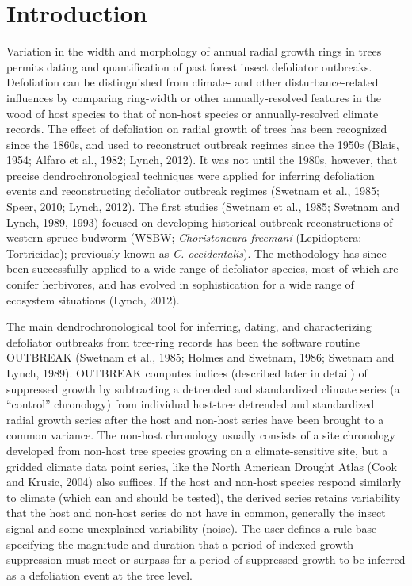 \documentclass[review]{elsarticle} %
\begin{document}
\hypertarget{introduction}{%
\section{Introduction}\label{introduction}}

Variation in the width and morphology of annual radial growth rings in trees permits dating and quantification of past forest insect defoliator outbreaks. Defoliation can be distinguished from climate- and other disturbance-related influences by comparing ring-width or other annually-resolved features in the wood of host species to that of non-host species or annually-resolved climate records. The effect of defoliation on radial growth of trees has been recognized since the 1860s, and used to reconstruct outbreak regimes since the 1950s (Blais, 1954; Alfaro et al., 1982; Lynch, 2012). It was not until the 1980s, however, that precise dendrochronological techniques were applied for inferring defoliation events and reconstructing defoliator outbreak regimes (Swetnam et al., 1985; Speer, 2010; Lynch, 2012). The first studies (Swetnam et al., 1985; Swetnam and Lynch, 1989, 1993) focused on developing historical outbreak reconstructions of western spruce budworm (WSBW; \emph{Choristoneura freemani} (Lepidoptera: Tortricidae); previously known as \emph{C. occidentalis}). The methodology has since been successfully applied to a wide range of defoliator species, most of which are conifer herbivores, and has evolved in sophistication for a wide range of ecosystem situations (Lynch, 2012).

The main dendrochronological tool for inferring, dating, and characterizing defoliator outbreaks from tree-ring records has been the software routine OUTBREAK (Swetnam et al., 1985; Holmes and Swetnam, 1986; Swetnam and Lynch, 1989). OUTBREAK computes indices (described later in detail) of suppressed growth by subtracting a detrended and standardized climate series (a ``control'' chronology) from individual host-tree detrended and standardized radial growth series after the host and non-host series have been brought to a common variance. The non-host chronology usually consists of a site chronology developed from non-host tree species growing on a climate-sensitive site, but a gridded climate data point series, like the North American Drought Atlas (Cook and Krusic, 2004) also suffices. If the host and non-host species respond similarly to climate (which can and should be tested), the derived series retains variability that the host and non-host series do not have in common, generally the insect signal and some unexplained variability (noise). The user defines a rule base specifying the magnitude and duration that a period of indexed growth suppression must meet or surpass for a period of suppressed growth to be inferred as a defoliation event at the tree level.
\end{document}
